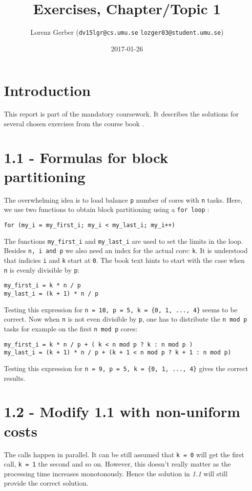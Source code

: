 \documentclass[a4paper,11pt,twoside]{article}
\title{Exercises, Chapter/Topic 1}
\author{Lorenz Gerber ({\tt{dv15lgr@cs.umu.se}} {\tt{lozger03@student.umu.se}})}
\date{2017-01-26}
\begin{document}
\lstset{language=C}
\maketitle
\thispagestyle{empty}
\newpage
\tableofcontents
\thispagestyle{empty}
\newpage

\clearpage
{}

\section{Introduction}
This report is part of the mandatory coursework. It describes the solutions for several chosen exercises from the course book \cite{pacheco2011}.
\section{1.1 - Formulas for block partitioning}
The overwhelming idea is to load balance \verb+p+ number of cores with \verb+n+ tasks. Here, we use two functions to obtain block partitioning using a \verb+for loop+ :
\begin{verbatim}
for (my_i = my_first_i; my_i < my_last_i; my_i++)
\end{verbatim}

The functions \verb+my_first_i+ and \verb+my_last_i+ are used to set the limits in the loop. Besides \verb+n, i and p+ we also need an index for the actual core: \verb+k+. It is understood that indicies \verb+i+ and \verb+k+ start at \verb+0+. The book text hints to start with the case when \verb+n+ is evenly divisible by \verb+p+:
\begin{verbatim}
my_first_i = k * n / p
my_last_i = (k + 1) * n / p
\end{verbatim}
Testing this expression for \verb!n = 10, p = 5, k = {0, 1, ..., 4}! seems to be correct. Now when  \verb+n+ is not even divisible by \verb+p+, one has to distribute the \verb+n mod p+ tasks for example on the first \verb+n mod p+ cores:
\begin{verbatim}
my_first_i = k * n / p + ( k < n mod p ? k : n mod p )
my_last_i = (k + 1) * n / p + (k + 1 < n mod p ? k + 1 : n mod p)  
\end{verbatim}
Testing this expression for \verb!n = 9, p = 5, k = {0, 1, ..., 4}! gives the correct results.
  
\section{1.2 - Modify 1.1 with non-uniform costs}
The calls happen in parallel. It can be still assumed that \verb+k = 0+ will get the first call, \verb+k = 1+ the second and so on. However, this doesn't really matter as the processing time increases monotonously. Hence the solution in \textit{1.1} will still provide the correct solution. 
\end{document}
